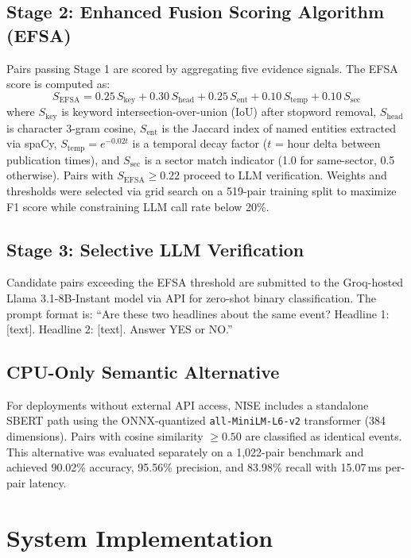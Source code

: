\documentclass[conference]{IEEEtran}
\begin{document}
\subsection{Stage 2: Enhanced Fusion Scoring Algorithm (EFSA)}
Pairs passing Stage 1 are scored by aggregating five evidence signals.
The EFSA score is computed as:
\begin{equation}
S_{\text{EFSA}} = 0.25\,S_{\text{key}} + 0.30\,S_{\text{head}} + 0.25\,S_{\text{ent}} + 0.10\,S_{\text{temp}} + 0.10\,S_{\text{sec}}
\end{equation}
where $S_{\text{key}}$ is keyword intersection-over-union (IoU) after stopword removal, $S_{\text{head}}$ is character 3-gram cosine, $S_{\text{ent}}$ is the Jaccard index of named entities extracted via spaCy, $S_{\text{temp}} = e^{-0.02t}$ is a temporal decay factor ($t$ = hour delta between publication times), and $S_{\text{sec}}$ is a sector match indicator (1.0 for same-sector, 0.5 otherwise).
Pairs with $S_{\text{EFSA}} \ge 0.22$ proceed to LLM verification.
Weights and thresholds were selected via grid search on a 519-pair training split to maximize F1 score while constraining LLM call rate below 20\%.

\subsection{Stage 3: Selective LLM Verification}
Candidate pairs exceeding the EFSA threshold are submitted to the Groq-hosted Llama 3.1-8B-Instant model via API for zero-shot binary classification.
The prompt format is: ``Are these two headlines about the same event? Headline 1: [text]. Headline 2: [text]. Answer YES or NO.''

\subsection{CPU-Only Semantic Alternative}
For deployments without external API access, NISE includes a standalone SBERT path using the ONNX-quantized \texttt{all-MiniLM-L6-v2} transformer (384 dimensions).
Pairs with cosine similarity $\ge 0.50$ are classified as identical events.
This alternative was evaluated separately on a 1,022-pair benchmark and achieved 90.02\% accuracy, 95.56\% precision, and 83.98\% recall with 15.07\,ms per-pair latency.

\section{System Implementation}
\end{document}
